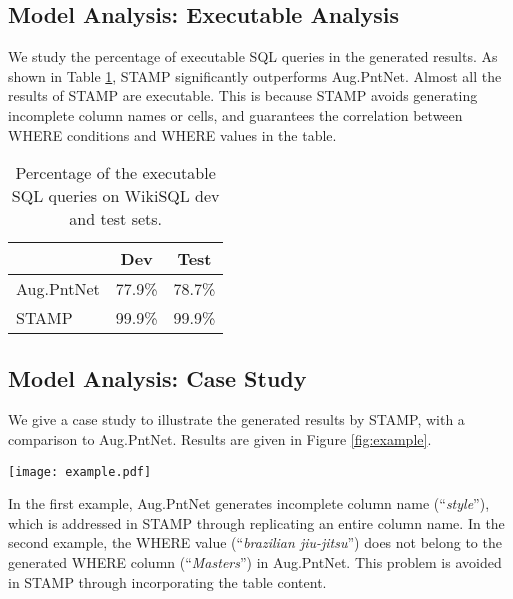 \documentclass[11pt,a4paper]{article}
\begin{document}
\subsection{Model Analysis: Executable Analysis}
We study the percentage of executable SQL queries in the generated results.
As shown in Table \ref{table:executable}, STAMP significantly outperforms Aug.PntNet.
Almost all the results of STAMP are executable.
This is because STAMP avoids generating incomplete column names or cells, and guarantees the correlation between WHERE conditions and WHERE values in the table.


\begin{table}[h]
	\centering
	\begin{tabular}{l|c|c}
		\hline
		& Dev& Test\\
		\hline
		Aug.PntNet &  77.9\%& 78.7\%\\
		STAMP  & 99.9\%& 99.9\%\\
		\hline
	\end{tabular}
	\caption{Percentage of the executable SQL queries on WikiSQL dev and test sets. }
	\label{table:executable}
\end{table}

\subsection{Model Analysis: Case Study}
We give a case study to illustrate the generated results by STAMP, with a comparison to Aug.PntNet.
Results are given in Figure \ref{fig:example}.
\begin{figure*}[t]
	\centering
	\texttt{[image: example.pdf]}
	\caption{Case study on the dev set between Aug.PntNet and STAMP. These two questions are based on the same table. Each question is followed by the generated SQL queries from the two approaches.}
	\label{fig:example}
\end{figure*}
In the first example, Aug.PntNet generates incomplete column name (``\textit{style}''), which is addressed in STAMP through replicating an entire column name.
In the second example, the WHERE value (``\textit{brazilian jiu-jitsu}'') does not belong to the generated WHERE column  ({``\textit{Masters}''}) in Aug.PntNet. This problem is avoided in STAMP through incorporating the table content.
\end{document}
